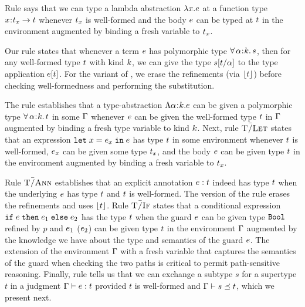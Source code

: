 %
\begin{fullversion}
    Rule \tAbs says that we can type a lambda abstraction
    $\lambda x. {e}$ at a function type $x\hspace{0.05em}{:}\hspace{0.05em} t_x \rightarrow t$
    whenever $t_x$ is well-formed and the body $e$
    can be typed at $t$ in the environment augmented by binding
    a fresh variable to $t_x$.  
\end{fullversion}
%
Our rule \tTApp states that whenever a term $e$ has polymorphic
type $\forall\, \alpha\hspace{0.05em}{:}\hspace{0.05em} k.\, s$, then for any well-formed type $t$
with kind $k$, %
we can give the type
${s}[t/\alpha]$ to the type application $e[t]$.
%
For the \sysf variant of \tTApp, we erase the refinements (via $\lfloor{\ensuremath{t}}\rfloor$)
before checking well-formedness and performing the substitution.
%
\begin{fullversion}
    The rule \tTAbs establishes that a type-abstraction $\Lambda{\alpha}\hspace{0.05em}{:}\hspace{0.05em}{\ensuremath{k}}.{e}$
    can be given a polymorphic type $\forall\, \alpha\hspace{0.05em}{:}\hspace{0.05em} k.\, t$ in some %
    $\mathrm{\Gamma}$ whenever $e$ can be given the well-formed type $t$
    in %
    $\mathrm{\Gamma}$ augmented by binding a fresh type variable
    to kind $k$.
    Next, rule $\textsc{T\=/Let}$ states that an expression ${{\texttt{let}}}\;x{{\;=\;}}e_x\;{{\texttt{in}}}\;e$ has type
    $t$ in some environment whenever $t$ is well-formed, $e_x$ can
    be given some type $t_x$, and the body $e$ can be given type $t$
    in the environment augmented by binding a fresh variable to $t_x$.
\end{fullversion}
%
Rule $\textsc{T\=/Ann}$ establishes that an explicit annotation $e : t$
indeed has type $t$ when the underlying %
$e$ has type $t$ and $t$ is well-formed.
The \sysf version of the rule erases the refinements and uses
$\lfloor{\ensuremath{t}}\rfloor$.
%
Rule $\textsc{T\=/If}$ states that a conditional expression ${{\texttt{if}}}\;{e}\;{{\texttt{then}}}\;{e_1}\;{{\texttt{else}}}\;{e_2}$
has the type $t$ when the guard $e$ can be 
given type $\texttt{Bool}$ refined by $p$ and $e_1$ (\resp $e_2$)
can be given type $t$ in the environment $\mathrm{\Gamma}$ 
augmented by the knowledge we have about the type 
and semantics of the guard $e$.
The extension of the environment $\mathrm{\Gamma}$
with a fresh variable that captures the semantics of the guard
when checking the two paths is critical to 
permit path-sensitive reasoning.
%
Finally, rule \tSub tells us that we can exchange a subtype $s$
for a supertype $t$ in a judgment ${\mathrm{\Gamma}} \vdash {\ensuremath{e}} : {t}$
provided 
$t$ is well-formed and
${\mathrm{\Gamma}} \vdash s \preceq t$, which we present next.
%
